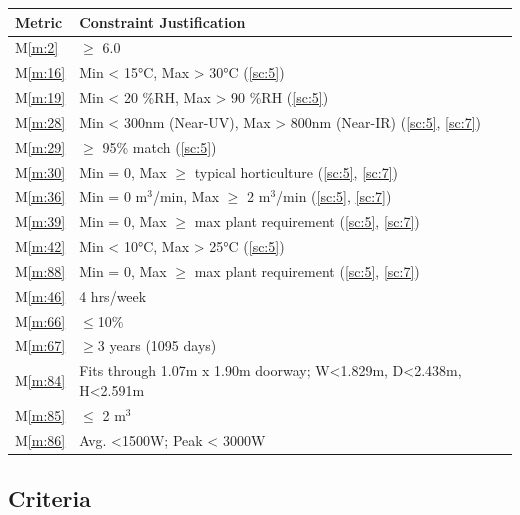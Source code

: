 \documentclass{report}
\newcommand{\mref}[1]{M\ref{#1}}
\begin{document}
\begin{tabular}{|l|p{14.35cm}|}
    \hline
    \textbf{Metric} & \textbf{Constraint \hfill Justification} \\
    \hline
    \mref{m:2} & $\ge$ 6.0 \hfill \cite{applicantguide}\\
    \hline
    \mref{m:16} & Min < 15°C, Max > 30°C \hfill (\ref{sc:5})\\
    \hline
    \mref{m:19} & Min < 20 \%RH, Max > 90 \%RH \hfill (\ref{sc:5}) \\
    \hline
    \mref{m:28} & Min < 300nm (Near-UV), Max > 800nm (Near-IR) \hfill (\ref{sc:5}, \ref{sc:7}) \\
    \hline
    \mref{m:29} & $\ge$ 95\% match \hfill (\ref{sc:5}) \\
    \hline
    \mref{m:30} & Min = 0, Max $\ge$ typical horticulture \hfill (\ref{sc:5}, \ref{sc:7}) \\
    \hline
    \mref{m:36} & Min = 0 m${}^3$/min, Max $\ge$ 2 m${}^3$/min \hfill (\ref{sc:5}, \ref{sc:7}) \\
    \hline
    \mref{m:39} & Min = 0, Max $\ge$ max plant requirement \hfill (\ref{sc:5}, \ref{sc:7}) \\
    \hline
    \mref{m:42} & Min < 10°C, Max > 25°C \hfill (\ref{sc:5})\\
    \hline
    \mref{m:88} & Min = 0, Max $\ge$ max plant requirement \hfill (\ref{sc:5}, \ref{sc:7}) \\
    \hline
    \mref{m:46} & 4 hrs/week \hfill \cite{applicantguide}\\
    \hline
    \mref{m:66} & $\le$10\% \hfill \cite{applicantguide}\\
    \hline
    \mref{m:67} & $\ge$3 years (1095 days) \hfill \cite{applicantguide}\\
    \hline
    \mref{m:84} & Fits through 1.07m x 1.90m doorway; W<1.829m, D<2.438m, H<2.591m \hfill \cite{applicantguide} \\
    \hline
    \mref{m:85} & $\le$ 2 m${}^3$ \hfill \cite{applicantguide}\\
    \hline
    \mref{m:86} & Avg. <1500W; Peak < 3000W \hfill \cite{applicantguide}\\
    \hline
\end{tabular}

\subsection{Criteria}
\label{sec:criteria}
\end{document}
